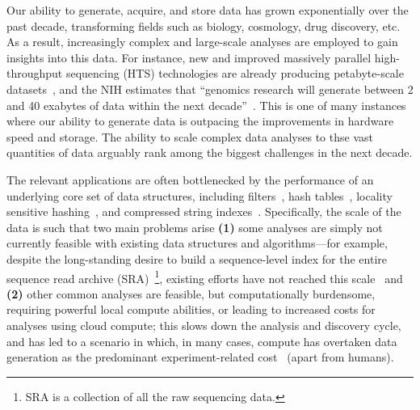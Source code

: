 Our ability to generate, acquire, and store data has grown exponentially over
the past decade, transforming fields such as biology, cosmology, drug
discovery, etc.   As a result, increasingly complex
and large-scale analyses are employed to gain insights into this data.  For
instance, new and improved
massively parallel high-throughput sequencing (HTS) technologies are already producing petabyte-scale
datasets~\cite{kodama2012sequence}, and the NIH estimates that ``genomics
research will generate between 2 and 40 exabytes of data within the next
decade''~\cite{NHGRIDataScience}. This is one of many instances where our
ability to generate data is outpacing the improvements in hardware speed and
storage. The ability to scale complex data analyses to thse vast quantities of data
arguably rank among the biggest challenges in the next decade. 

The relevant applications are often bottlenecked by the performance of an underlying core
set of data structures, including filters~\cite{PandeyAlBe18, solomon2016fast},
hash tables~\cite{solomon2016fast,almodaresi2022incrementally}, locality
sensitive hashing~\cite{Marais2019}, and compressed string
indexes~\cite{Almodaresi2018Pufferfish}. Specifically, the scale of the data is
such that two main problems arise \textbf{(1)} some analyses are simply not
currently feasible with existing data structures and algorithms---for example,
despite the long-standing desire to build a sequence-level index for the entire
sequence read archive (SRA)~\footnote{SRA is a collection of all the raw
sequencing data.}, existing efforts have not reached this
scale~\cite{Karasikov2020, HarrisM20, SolomonK17, almodaresi2022incrementally,
AlmodaresiPFJP20,PandeyAlBe18} and \textbf{(2)} other common analyses are
feasible, but computationally burdensome, requiring powerful local compute
abilities, or leading to increased costs for analyses using cloud compute; this
slows down the analysis and discovery cycle, and has led to a scenario in
which, in many cases, compute has overtaken data generation as the predominant
experiment-related cost~\cite{Muir_2016} (apart from humans).

